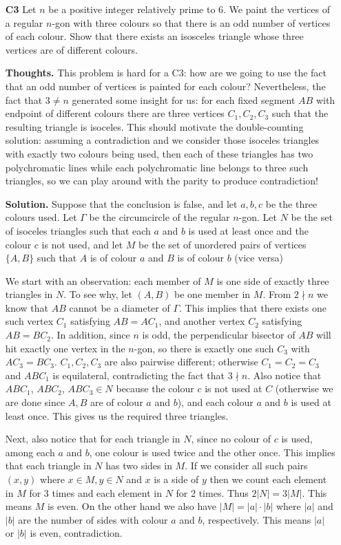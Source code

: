 \documentclass[11pt,a4paper]{article}
\begin{document}
\begin{itemize}
\item[\textbf{C3}]
Let $n$ be a positive integer relatively prime to $6$. We paint the vertices of a regular $n$-gon with three colours so that there is an odd number of vertices of each colour. Show that there exists an isosceles triangle whose three vertices are of different colours.

\textbf{Thoughts.} 
This problem is hard for a C3: how are we going to use the fact that an odd number of vertices is painted for each colour? 
Nevertheless, the fact that $3\neq n$ generated some insight for us: for each fixed segment $AB$ with endpoint of different colours there are three vertices $C_1, C_2, C_3$ such that the resulting triangle is isoceles. 
This should motivate the double-counting solution: assuming a contradiction and we consider those isoceles triangles with exactly two colours being used, then each of these triangles has two polychromatic lines while each polychromatic line belongs to three such triangles, so we can play around with the parity to produce contradiction!

\textbf{Solution.} 
Suppose that the conclusion is false, and let $a, b, c$ be the three colours used. 
Let $\Gamma$ be the circumcircle of the regular $n$-gon. 
Let $N$ be the set of isoceles triangles such that each $a$ and $b$ is used at least once and the colour $c$ is not used, 
and let $M$ be the set of unordered pairs of vertices $\{A, B\}$ such that $A$ is of colour $a$ and $B$ is of colour $b$ (vice versa) 

We start with an observation: each member of $M$ is one side of exactly three triangles in $N$. 
To see why, let $(A,B)$ be one member in $M$. From $2\nmid n$ we know that $AB$ cannot be a diameter of $\Gamma$. 
This implies that there exists one such vertex $C_1$ satisfying $AB=AC_1$, and another vertex $C_2$ satisfying $AB=BC_2$. 
In addition, since $n$ is odd, the perpendicular bisector of $AB$ will hit exactly one vertex in the $n$-gon, 
so there is exactly one such $C_3$ with $AC_3=BC_3$. 
$C_1, C_2, C_3$ are also pairwise different; otherwise $C_1=C_2=C_3$ and $ABC_1$ is equilateral, 
contradicting the fact that $3\nmid n$. 
Also notice that $ABC_1$, $ABC_2$, $ABC_3\in N$ because the colour $c$ is not used at $C$ (otherwise we are done since $A, B$ are of colour $a$ and $b$), and each colour $a$ and $b$ is used at least once. 
This gives us the required three triangles. 

Next, also notice that for each triangle in $N$, 
since no colour of $c$ is used, among each $a$ and $b$, one colour is used twice and the other once. 
This implies that each triangle in $N$ has two sides in $M$. 
If we consider all such pairs $(x, y)$ where $x\in M, y\in N$ and $x$ is a side of $y$ then we count each element in $M$ for 3 times and each element in $N$ for 2 times. 
Thus $2|N|=3|M|$. 
This means $M$ is even. On the other hand we also have $|M|=|a|\cdot |b|$ where $|a|$ and $|b|$ are the number of sides with colour $a$ and $b$, respectively. This means $|a|$ or $|b|$ is even, contradiction. 


\end{itemize}
\end{document}
